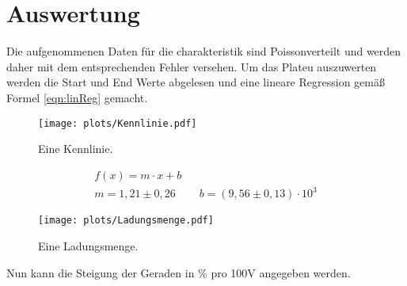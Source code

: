 \section{Auswertung}
\label{sec:Auswertung}
Die aufgenommenen Daten für die charakteristik sind Poissonverteilt und werden daher mit dem entsprechenden Fehler versehen.
Um das Plateu auszuwerten werden die Start und End Werte abgelesen und eine lineare Regression gemäß Formel \ref{eqn:linReg} gemacht.
\begin{figure}
    \centering
    \texttt{[image: plots/Kennlinie.pdf]}
    \caption{Eine Kennlinie.}
    \label{fig:Kennlinie}
\end{figure}
\begin{align}
    f(x) = m\cdot x +b \label{eqn:linReg}\\
    m = 1,21 \pm 0,26&& b = (9,56 \pm 0,13)\cdot 10^{3}
\end{align}
\begin{figure}
    \centering
    \texttt{[image: plots/Ladungsmenge.pdf]}
    \caption{Eine Ladungsmenge.}
    \label{fig:Ladungsmenge}
\end{figure}
Nun kann die Steigung der Geraden in \% pro  100V angegeben werden.